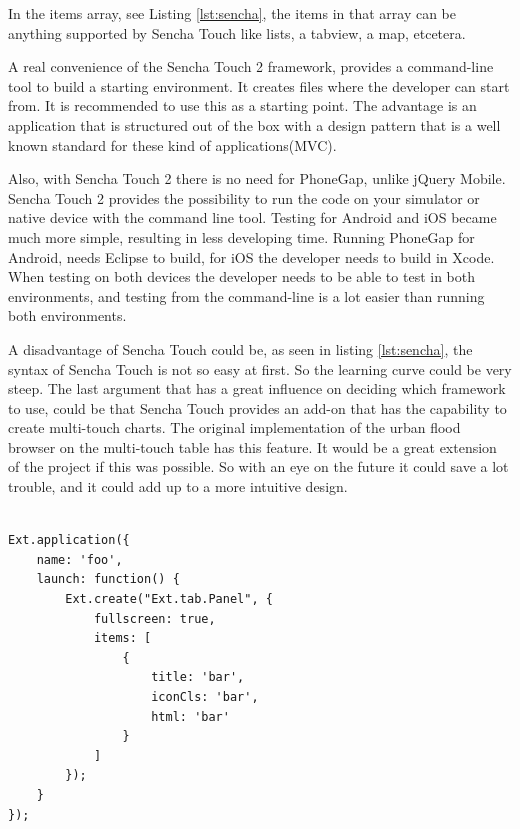 \begin{description}
In the items array, see Listing \ref{lst:sencha}, the items in that array can be anything supported by Sencha Touch like lists, a tabview, a map, etcetera. 

A real convenience of the Sencha Touch 2 framework, provides a command-line tool to build a starting environment. It creates files where the developer can start from. It is recommended to use this as a starting point. The advantage is an application that is structured out of the box with a design pattern that is a well known standard for these kind of applications(MVC). 

Also, with Sencha Touch 2 there is no need for PhoneGap, unlike jQuery Mobile. Sencha Touch 2 provides the possibility to run the code on your simulator or native device with the command line tool. Testing for Android and iOS became much more simple, resulting in less developing time. Running PhoneGap for Android, needs Eclipse\cite{eclipse} to build, for iOS the developer needs to build in Xcode\cite{xcode}. When testing on both devices the developer needs to be able to test in both environments, and testing from the command-line is a lot easier than running both environments. 
 
A disadvantage of Sencha Touch could be, as seen in listing \ref{lst:sencha}, the syntax of Sencha Touch is not so easy at first. So the learning curve could be very steep.
The last argument that has a great influence on deciding which framework to use, could be that Sencha Touch provides an add-on that has the capability to create multi-touch charts. The original implementation of the urban flood browser on the multi-touch table has this feature. It would be a great extension of the project if this was possible. So with an eye on the future it could save a lot trouble, and it could add up to a more intuitive design.

\vspace{1cm}
\begin{lstlisting}[caption=Sencha Touch application example. This example creates an application with the name 'foo'.  The html can be placed inside the items array, label={lst:sencha}]

Ext.application({
    name: 'foo',
    launch: function() {
        Ext.create("Ext.tab.Panel", {
            fullscreen: true,
            items: [
                {
                    title: 'bar',
                    iconCls: 'bar',
                    html: 'bar'
                }
            ]
        });
    }
});
\end{lstlisting}
\end{description}

